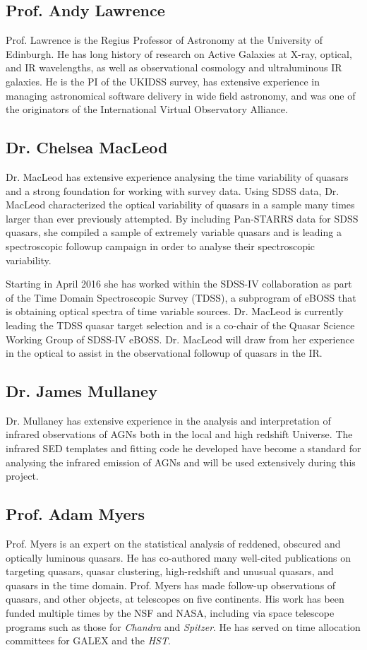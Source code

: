 \documentclass[11pt,a4paper]{article}
\begin{document}
\subsection*{Prof. Andy Lawrence}
Prof. Lawrence is the Regius Professor of Astronomy at the University
of Edinburgh. He has long history of research on Active Galaxies at
X-ray, optical, and IR wavelengths, as well as observational cosmology
and ultraluminous IR galaxies. He is the PI of the UKIDSS survey, has
extensive experience in managing astronomical software delivery in
wide field astronomy, and was one of the originators of the
International Virtual Observatory Alliance.


\subsection*{Dr. Chelsea MacLeod}
Dr. MacLeod has extensive experience analysing the time variability of
quasars and a strong foundation for working with survey data.  Using
SDSS data, Dr. MacLeod characterized the optical variability of
quasars in a sample many times larger than ever previously attempted.
By including Pan-STARRS data for SDSS quasars, she compiled a sample
of extremely variable quasars and is leading a spectroscopic followup
campaign in order to analyse their spectroscopic variability.

\smallskip \smallskip \noindent
Starting in April 2016 she has worked within the SDSS-IV collaboration
as part of the Time Domain Spectroscopic Survey (TDSS), a subprogram
of eBOSS that is obtaining optical spectra of time variable sources.
Dr. MacLeod is currently leading the TDSS quasar target selection and
is a co-chair of the Quasar Science Working Group of SDSS-IV
eBOSS. Dr. MacLeod will draw from her experience in the optical to
assist in the observational followup of quasars in the IR.


\subsection*{Dr. James Mullaney}
Dr. Mullaney has extensive experience in the analysis and
interpretation of infrared observations of AGNs both in the local and
high redshift Universe. The infrared SED templates and fitting code he
developed have become a standard for analysing the infrared emission
of AGNs and will be used extensively during this project.


\subsection*{Prof. Adam Myers}
Prof. Myers is an expert on the statistical analysis of reddened,
obscured and optically luminous quasars. He has co-authored many
well-cited publications on targeting quasars, quasar clustering,
high-redshift and unusual quasars, and quasars in the time
domain. Prof. Myers has made follow-up observations of quasars, and
other objects, at telescopes on five continents. His work has been
funded multiple times by the NSF and NASA, including via space
telescope programs such as those for {\it Chandra} and {\it Spitzer}. He has
served on time allocation committees for GALEX and the {\it HST}. 
\end{document}
